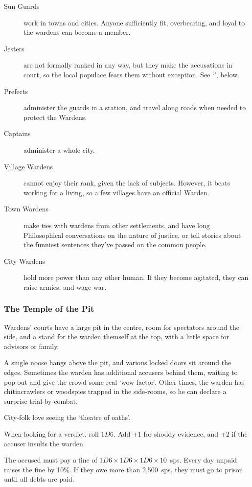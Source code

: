 \begin{multicols}{2}
\begin{description}
  \item[Sun Guards]
  work in towns and cities.
  Anyone sufficiently fit, overbearing, and loyal to the wardens can become a member.
  \item[Jesters]
  are not formally ranked in any way, but they make the accusations in court, so the local populace fears them without exception.
  See `', below.
  \item[Prefects]
  administer the guards in a station, and travel along roads when needed to protect the Wardens.
  \item[Captains]
  administer a whole city.
  \item[Village Wardens]
  cannot enjoy their rank, given the lack of subjects.
  However, it beats working for a living, so a few villages have an official Warden.
  \item[Town Wardens]
  make ties with wardens from other settlements, and have long Philosophical conversations on the nature of justice, or tell stories about the funniest sentences they've passed on the common people.
  \item[City Wardens]
  hold more power than any other human.
  If they become agitated, they can raise armies, and wage war.
\end{description}

\subsubsection{The Temple of the Pit}

Wardens' courts have a large pit in the centre, room for spectators around the side, and a stand for the warden themself at the top, with a little space for advisors or family.

A single noose hangs above the pit, and various locked doors sit around the edges.
Sometimes the warden has additional accusers behind them, waiting to pop out and give the crowd some real `wow-factor'.
Other times, the warden has chitincrawlers or woodspies trapped in the side-rooms, so he can declare a surprise trial-by-combat.

City-folk love seeing the `theatre of oaths'.

When looking for a verdict, roll $1D6$.
Add +1 for shoddy evidence, and +2 if the accuser insults the warden.

\begin{dlist}
  \item
  The accused must pay a fine of $1D6\times 1D6\times 1D6\times 10$~\glspl{sp}.
  Every day unpaid raises the fine by 10\%.
  If they owe more than 2,500~\glspl{sp}, they must go to prison until all debts are paid.


\end{dlist}
\end{multicols}
